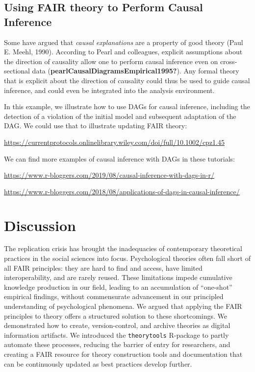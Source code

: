 \documentclass[
  man,floatsintext]{apa6}
\begin{document}
\subsection{Using FAIR theory to Perform Causal Inference}\label{using-fair-theory-to-perform-causal-inference}

Some have argued that \emph{causal explanations} are a property of good theory (Paul E. Meehl, 1990).
According to Pearl and colleagues,
explicit assumptions about the direction of causality allow one to perform causal inference even on cross-sectional data (\textbf{pearlCausalDiagramsEmpirical1995?}).
Any formal theory that is explicit about the direction of causality could thus be used to guide causal inference,
and could even be integrated into the analysis environment.

In this example, we illustrate how to use DAGs for causal inference, including the detection of a violation of the initial model and subsequent adaptation of the DAG. We could use that to illustrate updating FAIR theory:

\url{https://currentprotocols.onlinelibrary.wiley.com/doi/full/10.1002/cpz1.45}

We can find more examples of causal inference with DAGs in these tutorials:

\url{https://www.r-bloggers.com/2019/08/causal-inference-with-dags-in-r/}

\url{https://www.r-bloggers.com/2018/08/applications-of-dags-in-causal-inference/}

\section{Discussion}\label{discussion}

The replication crisis has brought the inadequacies of contemporary theoretical practices in the social sciences into focus.
Psychological theories often fall short of all FAIR principles: they are hard to find and access, have limited interoperability, and are rarely reused.
These limitations impede cumulative knowledge production in our field,
leading to an accumulation of ``one-shot'' empirical findings, without commensurate advancement in our principled understanding of psychological phenomena.
We argued that applying the FAIR principles to theory offers a structured solution to these shortcomings.
We demonstrated how to create, version-control, and archive theories as digital information artifacts.
We introduced the \texttt{theorytools} R-package to partly automate these processes, reducing the barrier of entry for researchers,
and creating a FAIR resource for theory construction tools and documentation that can be continuously updated as best practices develop further.
\end{document}
